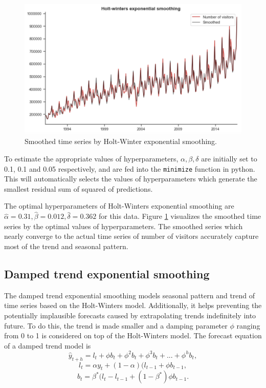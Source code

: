\documentclass[letterpaper,12pt,twoside,]{pinp}
\begin{document}
\begin{figure}
\includegraphics[width=1\linewidth]{HW_es.png}
\centering
\caption{Smoothed time series by Holt-Winter exponential smoothing.}
\label{fig:hw_es}
\end{figure}

To estimate the appropriate values of hyperparameters,
\(\alpha, \beta,\delta\) are initially set to 0.1, 0.1 and 0.05
respectively, and are fed into the \texttt{minimize} function in python.
This will automatically selects the values of hyperparameters which
generate the smallest residual sum of squared of predictions.

The optimal hyperparameters of Holt-Winters exponential smoothing are
\(\hat\alpha=0.31,\hat\beta=0.012,\hat\delta=0.362\) for this data.
Figure \ref{fig:hw_es} visualizes the smoothed time series by the
optimal values of hyperparameters. The smoothed series which nearly
converge to the actual time series of number of visitors accurately
capture most of the trend and seasonal pattern.

\hypertarget{damped-trend-exponential-smoothing}{%
\subsection{Damped trend exponential
smoothing}\label{damped-trend-exponential-smoothing}}

The damped trend exponential smoothing models seasonal pattern and trend
of time series based on the Holt-Winters model. Additionally, it helps
preventing the potentially implausible forecasts caused by extrapolating
trends indefinitely into future. To do this, the trend is made smaller
and a damping parameter \(\phi\) ranging from 0 to 1 is considered on
top of the Holt-Winters model. The forecast equation of a damped trend
model is \[
\hat y_{t+h}=l_t+\phi b_t+\phi^2b_t+\phi^3b_t+...+\phi^hb_t,
\] \[
l_t=\alpha y_t+(1-\alpha)(l_{t-1}+\phi b_{t-1},
\] \[
b_t=\beta^*(l_t-l_{t-1}+(1-\beta^*)\phi b_{t-1}.
\]
\end{document}
